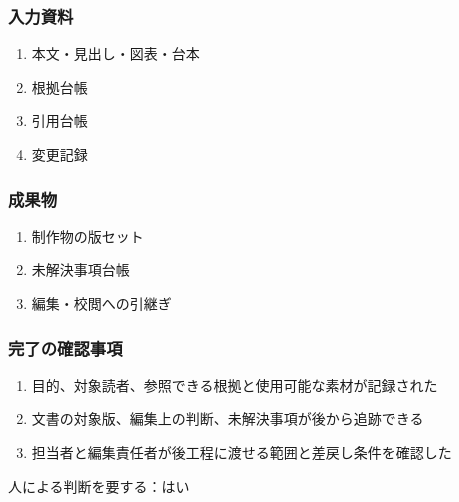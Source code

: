 \documentclass[a4paper,11pt]{article}
\begin{document}
\subsubsection*{入力資料}
\begin{enumerate}[leftmargin=2em,itemsep=0.35em]
\item 本文・見出し・図表・台本
\item 根拠台帳
\item 引用台帳
\item 変更記録
\end{enumerate}
\subsubsection*{成果物}
\begin{enumerate}[leftmargin=2em,itemsep=0.35em]
\item 制作物の版セット
\item 未解決事項台帳
\item 編集・校閲への引継ぎ
\end{enumerate}
\subsubsection*{完了の確認事項}
\begin{enumerate}[leftmargin=2em,itemsep=0.35em]
\item 目的、対象読者、参照できる根拠と使用可能な素材が記録された
\item 文書の対象版、編集上の判断、未解決事項が後から追跡できる
\item 担当者と編集責任者が後工程に渡せる範囲と差戻し条件を確認した
\end{enumerate}
\par 人による判断を要する：はい\par\medskip
\end{document}
